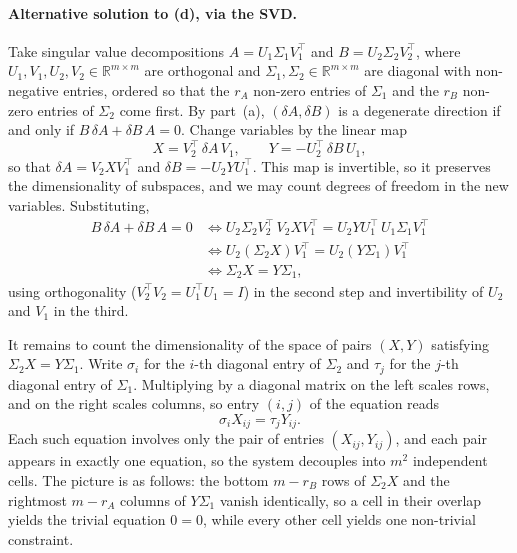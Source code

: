 \documentclass[11pt]{article}
\newcommand{\R}{\mathbb{R}}
\begin{document}
\begin{solution}
\paragraph{Alternative solution to (d), via the SVD.}
Take singular value decompositions
    $A = U_1 \Sigma_1 V_1^\top$
and
    $B = U_2 \Sigma_2 V_2^\top$,
where $U_1, V_1, U_2, V_2 \in \R^{m \times m}$ are orthogonal and
$\Sigma_1, \Sigma_2 \in \R^{m \times m}$ are diagonal with non-negative
entries, ordered so that the $r_A$ non-zero entries of $\Sigma_1$ and the
$r_B$ non-zero entries of $\Sigma_2$ come first.
By part~(a), $(\delta\!A, \delta\!B)$ is a degenerate direction if and only
if $B\,\delta\!A + \delta\!B\, A = 0$.
Change variables by the linear map
\begin{equation*}
    X = V_2^\top\, \delta\!A\, V_1,
    \qquad
    Y = -U_2^\top\, \delta\!B\, U_1,
\end{equation*}
so that $\delta\!A = V_2 X V_1^\top$ and $\delta\!B = -U_2 Y U_1^\top$.
This map is invertible, so it preserves the dimensionality of subspaces,
and we may count degrees of freedom in the new variables. Substituting,
\begin{align*}
    B\,\delta\!A + \delta\!B\, A = 0
    &\iff
        U_2 \Sigma_2 V_2^\top\, V_2 X V_1^\top
        = U_2 Y U_1^\top\, U_1 \Sigma_1 V_1^\top
\\  &\iff
        U_2 \left( \Sigma_2 X \right) V_1^\top
        = U_2 \left( Y \Sigma_1 \right) V_1^\top
\\  &\iff
        \Sigma_2 X = Y \Sigma_1,
\end{align*}
using orthogonality ($V_2^\top V_2 = U_1^\top U_1 = I$) in the second step
and invertibility of $U_2$ and $V_1$ in the third.

It remains to count the dimensionality of the space of pairs $(X, Y)$
satisfying $\Sigma_2 X = Y \Sigma_1$.
Write $\sigma_i$ for the $i$-th diagonal entry of $\Sigma_2$ and $\tau_j$
for the $j$-th diagonal entry of $\Sigma_1$.
Multiplying by a diagonal matrix on the left scales rows, and on the right
scales columns, so entry $(i, j)$ of the equation reads
\begin{equation*}
    \sigma_i X_{ij} = \tau_j Y_{ij}.
\end{equation*}
Each such equation involves only the pair of entries $(X_{ij}, Y_{ij})$, and
each pair appears in exactly one equation, so the system decouples into
$m^2$ independent cells.
The picture is as follows: the bottom $m - r_B$ rows of $\Sigma_2 X$ and
the rightmost $m - r_A$ columns of $Y \Sigma_1$ vanish identically, so a
cell in their overlap yields the trivial equation $0 = 0$, while every
other cell yields one non-trivial constraint.
\begin{center}
\end{center}
\end{solution}
\end{document}
